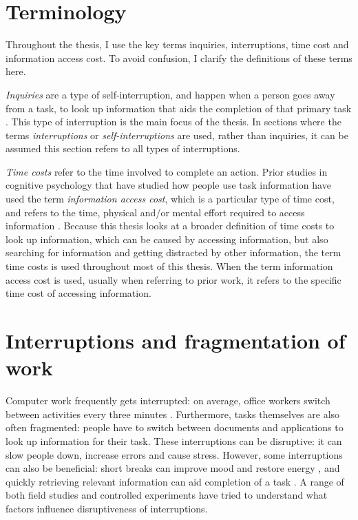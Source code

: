 \section{Terminology}
Throughout the thesis, I use the key terms inquiries, interruptions, time cost and information access cost. To avoid confusion, I clarify the definitions of these terms here.

\textit{Inquiries} are a type of self-interruption, and happen when a person goes away from a task, to look up information that aids the completion of that primary task \citep{Jin2009}. This type of interruption is the main focus of the thesis. In sections where the terms \textit{interruptions} or \textit{self-interruptions} are used, rather than inquiries, it can be assumed this section refers to all types of interruptions. 

\textit{Time costs} refer to the time involved to complete an action. Prior studies in cognitive psychology that have studied how people use task information have used the term \textit{information access cost}, which  is a particular type of time cost, and refers to the time, physical and/or mental effort required to access information \citep{Gray2006}. Because this thesis looks at a broader definition of time costs to look up information, which can be caused by accessing information, but also searching for information and getting distracted by other information, the term time costs is used throughout most of this thesis. When the term information access cost is used, usually when referring to prior work, it refers to the specific time cost of accessing information. 

\section{Interruptions and fragmentation of work}
Computer work frequently gets interrupted: on average, office workers switch between activities every three minutes \citep{Gonzalez2004}. Furthermore, tasks themselves are also often fragmented: people have to switch between documents and applications to look up information for their task. These interruptions can be disruptive: it can slow people down, increase errors and cause stress. However, some interruptions can also be beneficial: short breaks can improve mood and restore energy \citep{Mark2014a}, and quickly retrieving relevant information can aid completion of a task \citep{Jin2009}. A range of both field studies and controlled experiments have tried to understand what factors influence disruptiveness of interruptions.

